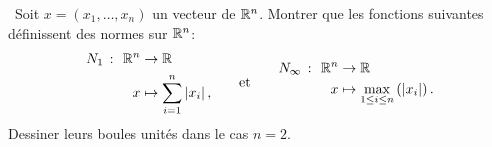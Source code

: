 \begin{td-exo}\, %
    Soit \(x = (x_1,\ldots,x_n)\) un vecteur de \(\mathbb{R}^n\). Montrer que les fonctions suivantes définissent des normes sur \(\mathbb{R}^n\):
    \begin{equation*}
        \begin{aligned}
            N_1\ \colon\ \mathbb{R}^n &\to \mathbb{R} \\
            x &\mapsto \sum_{i=1}^n \left\lvert x_i\right\rvert,
        \end{aligned}
        \qquad\text{et}\qquad
        \begin{aligned}
            N_\infty\ \colon\ \mathbb{R}^n &\to \mathbb{R} \\
            x &\mapsto \max_{1 \leq i \leq n} \left(\left\lvert x_i\right\rvert\right).
        \end{aligned}
    \end{equation*}
    Dessiner leurs boules unités dans le cas \(n = 2\).
\end{td-exo}
